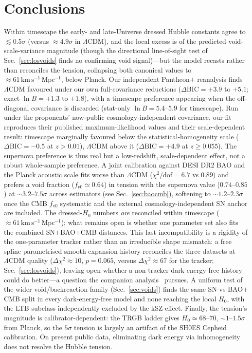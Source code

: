 \documentclass[aps,prd,twocolumn,nofootinbib,superscriptaddress,floatfix]{revtex4-2}
\newcommand{\Ho}{H_{0}}
\newcommand{\fvo}{f_{v0}}
\newcommand{\kmsmpc}{\,\mathrm{km\,s^{-1}\,Mpc^{-1}}}
\newcommand{\Lcdm}{\Lambda\mathrm{CDM}}
\newcommand{\dBIC}{\Delta\mathrm{BIC}}
\begin{document}
\section{Conclusions}
\label{sec:concl}
Within timescape the early- and late-Universe dressed Hubble constants agree to
$\lesssim0.5\sigma$ (versus $\approx4.9\sigma$ in $\Lcdm$), and the local excess is
of the predicted void-scale-variance magnitude (though the directional
line-of-sight test of Sec.~\ref{sec:losvoids} finds no confirming void
signal)---but the model recasts rather than
reconciles the tension, collapsing both canonical values to $\approx61\kmsmpc$,
below Planck. Our independent Pantheon$+$ reanalysis finds $\Lcdm$ favoured under our own
full-covariance reductions ($\dBIC=+3.9$ to $+5.1$; exact $\ln B=+1.3$ to $+1.8$),
with a timescape preference appearing when the off-diagonal covariance is discarded
(stat-only $\ln B=5.4$--$5.9$ for timescape). Run under the proponents' now-public
cosmology-independent covariance, our fit reproduces their published
maximum-likelihood values and their scale-dependent result: timescape marginally
favoured below the statistical-homogeneity scale ($\dBIC=-0.5$ at $z>0.01$),
$\Lcdm$ above it ($\dBIC=+4.9$ at $z\geq0.055$). The supernova preference is thus
real but a low-redshift, scale-dependent effect, not a robust whole-sample
preference. A joint calibration against DESI DR2 BAO and the Planck
acoustic scale fits worse than $\Lcdm$ ($\chi^2/\mathrm{dof}=6.7$ vs $0.89$) and
prefers a void fraction ($\fvo\simeq0.64$) in tension with the supernova value
($0.74$--$0.85$) at $\sim3.2$--$7.5\sigma$ across estimators (see
Sec.~\ref{sec:baocmb}), softening to $\sim1.2$--$2.3\sigma$ once the CMB $\fvo$
systematic and the external cosmology-independent SN anchor are included. The dressed-$\Ho$
numbers \emph{are} reconciled within timescape ($\approx61\kmsmpc$); what remains
open is whether one parameter set also fits the combined SN$+$BAO$+$CMB distances.
This last incompatibility is a rigidity of the one-parameter tracker rather than an
irreducible shape mismatch: a free spline-parametrised smooth expansion history
reconciles the three datasets at $\Lcdm$ quality ($\Delta\chi^2\approx10$,
$p=0.065$, versus $\Delta\chi^2\approx67$ for the tracker; Sec.~\ref{sec:losvoids}),
leaving open whether a non-tracker dark-energy-free history could do better---a
question the companion analysis~\cite{FreeHistory2025} pursues.
A uniform test of the wider void/backreaction family (Sec.~\ref{sec:voids}) finds
the same SN-vs-BAO$+$CMB split in every dark-energy-free model and none reaching
the local $\Ho$, with the LTB subclass independently excluded by the kSZ effect.
Finally, the tension's magnitude is calibrator-dependent: the TRGB ladder gives
$\Ho\simeq68$--$70$, $\sim1$--$1.5\sigma$ from Planck, so the $5\sigma$ tension is
largely an artifact of the SH0ES Cepheid calibration. On present public data,
eliminating dark energy via inhomogeneity does not resolve the Hubble tension.
\end{document}
